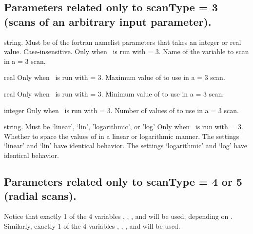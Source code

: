 \subsection{Parameters related only to {\ttfamily scanType} = 3 (scans of an arbitrary input parameter).}

{string. Must be of the fortran namelist parameters that takes an integer or real value. Case-insensitive.}
{Only when \sfincsScan~is run with  = 3.}
{Name of the variable to scan in a  = 3 scan.}

\myhrule

{real}
{Only when \sfincsScan~is run with  = 3.}
{Maximum value of  to use in a  = 3 scan.}

\myhrule

{real}
{Only when \sfincsScan~is run with  = 3.}
{Minimum value of  to use in a  = 3 scan.}

\myhrule

{integer}
{Only when \sfincsScan~is run with  = 3.}
{Number of values of  to use in a  = 3 scan.}

\myhrule

{string. Must be `linear', `lin', 'logarithmic', or 'log'}
{Only when \sfincsScan~is run with  = 3.}
{Whether to space the values of  in a linear or logarithmic manner.
The settings `linear' and `lin' have identical behavior. 
The settings `logarithmic' and `log' have identical behavior.}

\myhrule


\subsection{Parameters related only to {\ttfamily scanType} = 4 or 5 (radial scans).}

Notice that exactly 1 of the 4 variables , , , and 
will be used, depending on
.
Similarly, exactly 1 of the 4 variables
, , , and 
will be used.

\myhrule

